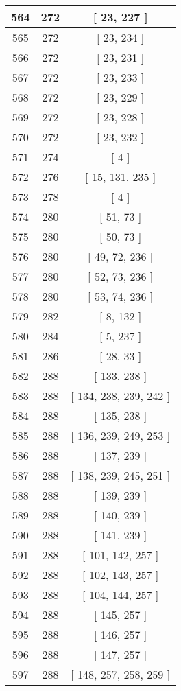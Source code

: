 \begin{center}
\begin{longtable}[H]{|| c c c ||}
564 & 272 & [ 23, 227 ] \\ 
\hline
565 & 272 & [ 23, 234 ] \\ 
\hline
566 & 272 & [ 23, 231 ] \\ 
\hline
567 & 272 & [ 23, 233 ] \\ 
\hline
568 & 272 & [ 23, 229 ] \\ 
\hline
569 & 272 & [ 23, 228 ] \\ 
\hline
570 & 272 & [ 23, 232 ] \\ 
\hline
571 & 274 & [ 4 ] \\ 
\hline
572 & 276 & [ 15, 131, 235 ] \\ 
\hline
573 & 278 & [ 4 ] \\ 
\hline
574 & 280 & [ 51, 73 ] \\ 
\hline
575 & 280 & [ 50, 73 ] \\ 
\hline
576 & 280 & [ 49, 72, 236 ] \\ 
\hline
577 & 280 & [ 52, 73, 236 ] \\ 
\hline
578 & 280 & [ 53, 74, 236 ] \\ 
\hline
579 & 282 & [ 8, 132 ] \\ 
\hline
580 & 284 & [ 5, 237 ] \\ 
\hline
581 & 286 & [ 28, 33 ] \\ 
\hline
582 & 288 & [ 133, 238 ] \\ 
\hline
583 & 288 & [ 134, 238, 239, 242 ] \\ 
\hline
584 & 288 & [ 135, 238 ] \\ 
\hline
585 & 288 & [ 136, 239, 249, 253 ] \\ 
\hline
586 & 288 & [ 137, 239 ] \\ 
\hline
587 & 288 & [ 138, 239, 245, 251 ] \\ 
\hline
588 & 288 & [ 139, 239 ] \\ 
\hline
589 & 288 & [ 140, 239 ] \\ 
\hline
590 & 288 & [ 141, 239 ] \\ 
\hline
591 & 288 & [ 101, 142, 257 ] \\ 
\hline
592 & 288 & [ 102, 143, 257 ] \\ 
\hline
593 & 288 & [ 104, 144, 257 ] \\ 
\hline
594 & 288 & [ 145, 257 ] \\ 
\hline
595 & 288 & [ 146, 257 ] \\ 
\hline
596 & 288 & [ 147, 257 ] \\ 
\hline
597 & 288 & [ 148, 257, 258, 259 ] \\ 

\end{longtable}
\end{center}
